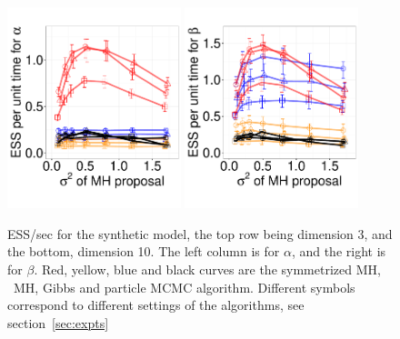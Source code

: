 {\begin{figure}[H]
\begin{minipage}[!hp]{0.99\linewidth}
\begin{minipage}[!hp]{0.99\linewidth}
  \end{minipage}
  \centering
  \begin{minipage}[!hp]{0.99\linewidth}
    \includegraphics [width=0.45\textwidth, angle=0]{figs/exp_10_alpha.pdf}
    \includegraphics [width=0.45\textwidth, angle=0]{figs/exp_10_beta.pdf}
  \end{minipage}
  \end{minipage}
    \caption{ESS/sec for the synthetic  model, the top row being dimension 3, and the bottom,
      dimension 10. The left column is for $\alpha$, and the 
    right is for $\beta$. Red, yellow, blue and black curves are the symmetrized MH,
  \naive\ MH, Gibbs and particle MCMC algorithm. Different symbols correspond
to different settings of the algorithms, see section~\ref{sec:expts}}
     \label{fig:ESS_EXP_D10}
  \end{figure}

}
